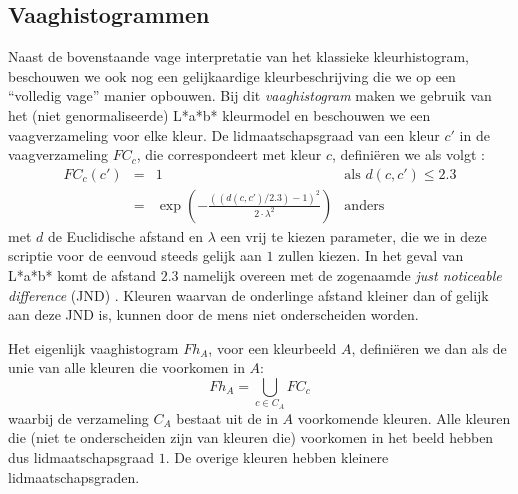 

\subsection{Vaaghistogrammen}

Naast de bovenstaande vage interpretatie van het klassieke kleurhistogram, beschouwen we
ook nog een gelijkaardige kleurbeschrijving die we op een ``volledig vage'' manier opbouwen. Bij dit
\emph{vaaghistogram} maken we gebruik van het (niet genormaliseerde) L*a*b* kleurmodel en 
beschouwen we een vaagverzameling voor elke kleur. 
De lidmaatschapsgraad van een kleur $c'$ in de vaagverzameling 
$FC_c$, die correspondeert met kleur $c$, defini\"eren we als volgt 
\cite{vertan:embedding_fuzzy_logic_in_cbir,vertan:fuzzy_histograms}: 
$$
\begin{array}{rcll}
FC_c(c') & = & 1 & \textrm{als } d(c,c') \leq 2.3 \\
		 & = & \exp \left( - \frac{\left((d(c,c') / 2.3) - 1\right)^2}{2 \cdot \lambda^2} \right) & \textrm{anders}
\end{array}
$$  
met $d$ de Euclidische afstand en $\lambda$ een vrij te kiezen parameter, die we in deze scriptie
voor de eenvoud steeds gelijk aan $1$ zullen kiezen. In het geval van L*a*b* 
komt de afstand $2.3$ namelijk overeen met de zogenaamde \emph{just noticeable difference} (JND)
\cite{sharma:digital_color_imaging}. 
Kleuren waarvan de onderlinge afstand kleiner dan of gelijk aan deze JND is, kunnen door de mens 
niet onderscheiden worden.

Het eigenlijk vaaghistogram $Fh_A$, voor een kleurbeeld $A$, defini\"eren we dan als de unie van 
alle kleuren die voorkomen in $A$:
$$
Fh_A = \displaystyle\bigcup_{c \in C_A} FC_c
$$ 
waarbij de verzameling $C_A$ bestaat uit de in $A$ voorkomende kleuren. Alle kleuren die 
(niet te onderscheiden zijn van kleuren die) voorkomen
in het beeld hebben dus lidmaatschapsgraad $1$. De overige kleuren hebben kleinere 
lidmaatschapsgraden.


